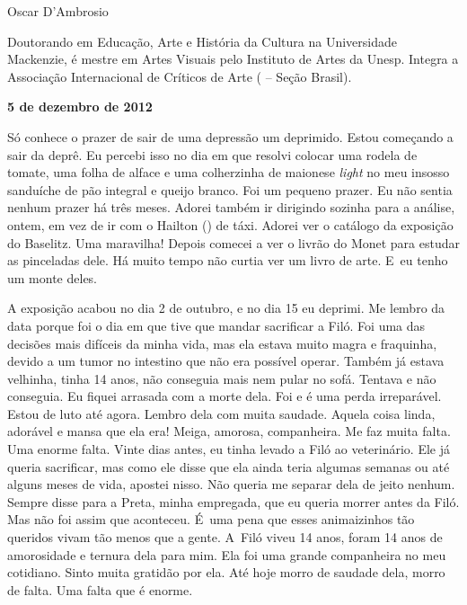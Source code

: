\medskip{} 
\begin{flushright}Oscar D'Ambrosio\end{flushright}

\begin{flushright}Doutorando em Educação, Arte e História da Cultura na Universidade
Mackenzie, é mestre em Artes Visuais pelo Instituto de Artes da Unesp.
Integra a Associação Internacional de Críticos de Arte ( -- Seção
Brasil).\end{flushright}

\begin{center}\asterisc{}\end{center}


\begin{flushright}\textbf{5 de dezembro de 2012}\end{flushright}


Só conhece o prazer de sair de uma depressão um deprimido. Estou
começando a sair da deprê. Eu percebi isso no dia em que resolvi colocar
uma rodela de tomate, uma folha de alface e uma colherzinha de maionese
\emph{light} no meu insosso sanduíche de pão integral e queijo branco.
Foi um pequeno prazer. Eu não sentia nenhum prazer há três meses. Adorei
também ir dirigindo sozinha para a análise, ontem, em vez de ir com o
Hailton () de táxi. Adorei ver o catálogo da exposição do Baselitz.
Uma maravilha! Depois comecei a ver o livrão do Monet para estudar as
pinceladas dele. Há muito tempo não curtia ver um livro de arte. E~eu
tenho um monte deles.

A exposição acabou no dia 2 de outubro, e no dia 15 eu deprimi. Me
lembro da data porque foi o dia em que tive que mandar sacrificar a
Filó. Foi uma das decisões mais difíceis da minha vida, mas ela estava
muito magra e fraquinha, devido a um tumor no intestino que não era
possível operar. Também já estava velhinha, tinha 14 anos, não conseguia
mais nem pular no sofá. Tentava e não conseguia. Eu fiquei arrasada com
a morte dela. Foi e é uma perda irreparável. Estou de luto até agora.
Lembro dela com muita saudade. Aquela coisa linda, adorável e mansa que
ela era! Meiga, amorosa, companheira. Me faz muita falta. Uma enorme
falta. Vinte dias antes, eu tinha levado a Filó ao veterinário. Ele já
queria sacrificar, mas como ele disse que ela ainda teria algumas
semanas ou até alguns meses de vida, apostei nisso. Não queria me
separar dela de jeito nenhum. Sempre disse para a Preta, minha
empregada, que eu queria morrer antes da Filó. Mas não foi assim que
aconteceu. É~uma pena que esses animaizinhos tão queridos vivam tão
menos que a gente. A~Filó viveu 14 anos, foram 14 anos de amorosidade e
ternura dela para mim. Ela foi uma grande companheira no meu cotidiano.
Sinto muita gratidão por ela. Até hoje morro de saudade dela, morro de
falta. Uma falta que é enorme.

